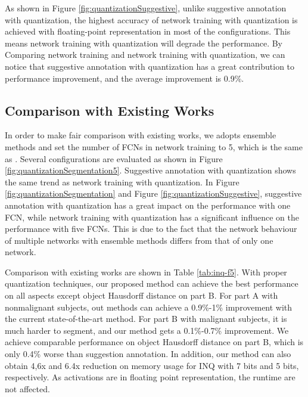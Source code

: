 \documentclass[10pt,twocolumn,letterpaper]{article}
\begin{document}
As shown in Figure \ref{fig:quantizationSuggestive}, unlike suggestive annotation with quantization, the highest accuracy of network training with quantization is achieved with floating-point representation in most of the configurations.
This means network training with quantization will degrade the performance.
By Comparing network training and network training with quantization, we can notice that suggestive annotation with quantization has a great contribution to performance improvement, and the average improvement is 0.9\%.



\vspace{6pt}
\subsection{Comparison with Existing Works}

In order to make fair comparison with existing works, we adopts ensemble methods and set the number of FCNs in network training to 5, which is the same as \cite{yang2017suggestive}.
Several configurations are evaluated as shown in Figure \ref{fig:quantizationSegmentation5}.
Suggestive annotation with quantization shows the same trend as network training with quantization.
In Figure \ref{fig:quantizationSegmentation} and Figure \ref{fig:quantizationSuggestive}, suggestive annotation with quantization has a great impact on the performance with one FCN, while network training with quantization has a significant influence on the performance with five FCNs.
This is due to the fact that the network behaviour of multiple networks with ensemble methods differs from that of only one network.

Comparison with existing works are shown in Table \ref{tab:inq-f5}.
With proper quantization techniques, our proposed method can achieve the best performance on all aspects except object Hausdorff distance on part B.
For part A with nonmalignant subjects, out methods can achieve a 0.9\%-1\% improvement with the current state-of-the-art method.
For part B with malignant subjects, it is much harder to segment, and our method gets a 0.1\%-0.7\% improvement.
We achieve comparable performance on object Hausdorff distance on part B, which is only 0.4\% worse than suggestion annotation.
In addition, our method can also obtain 4,6x and 6.4x reduction on memory usage for INQ with 7 bits and 5 bits, respectively.
As activations are in floating point representation, the runtime are not affected.
\end{document}

